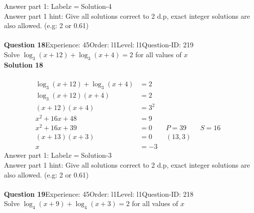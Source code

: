 \documentclass{article}
\begin{document}
Answer part 1: \hspace{10pt}Label\hspace{10pt}$x=$\hspace{10pt}Solution\hspace{10pt}-4\\
Answer part 1 hint: \hspace{15pt}Give all solutions correct to 2 d.p, exact integer solutions are also allowed. (e.g: 2 or 0.61)\\
\\[4pt]
\noindent\textbf{Question 18}\hspace{20pt}Experience: 45\hspace{20pt}Order: l1\hspace{20pt}Level: l1\hspace{20pt}Question-ID: 219\\[2pt]
Solve $\log_{3}(x+12)+\log_{3}(x+4)=2$ for all values of $x$\\[4pt]
\noindent\textbf{Solution 18}\\[2pt]
\\[-35pt]\begin{align*}
\log_{3}(x+12)+\log_{3}(x+4)&=2\\[2pt]
\log_{3}(x+12)(x+4)&=2\\[2pt]
(x+12)(x+4)&=3^2\\[2pt]
x^2+16x+48&=9\\[2pt]
x^2+16x+39&=0\qquad P=39 \qquad S=16\\[2pt]
(x+13)(x+3)&=0\qquad (13,3)\\[2pt]
x&=-3
\end{align*}
Answer part 1: \hspace{10pt}Label\hspace{10pt}$x=$\hspace{10pt}Solution\hspace{10pt}-3\\
Answer part 1 hint: \hspace{15pt} Give all solutions correct to 2 d.p, exact integer solutions are also allowed. (e.g: 2 or 0.61)\\
\\[4pt]
\noindent\textbf{Question 19}\hspace{20pt}Experience: 45\hspace{20pt}Order: l1\hspace{20pt}Level: l1\hspace{20pt}Question-ID: 218\\[2pt]
Solve $\log_{4}(x+9)+\log_{4}(x+3)=2$ for all values of $x$\\[4pt]
\end{document}
